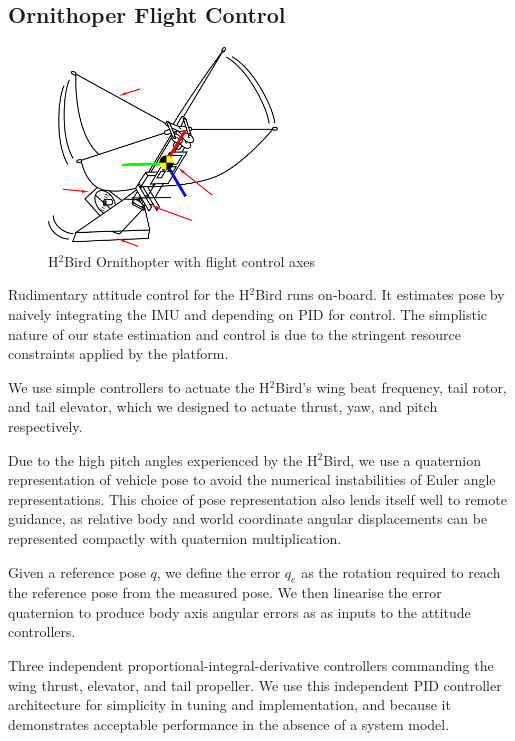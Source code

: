 \documentclass{aamas2013}
\begin{document}
\subsection{Ornithoper Flight Control}

\begin{figure}[tb]
\centering
\includegraphics[height=150pt]{figures/h2bird_axes.png}
\caption{H$^2$Bird Ornithopter with flight control axes}
\label{fig:h2Bird_axes}
\end{figure}

Rudimentary attitude control for the H$^2$Bird runs on-board. It estimates 
pose by naively integrating the IMU and depending on PID for control. The 
simplistic nature of our state estimation and control is due to the 
stringent resource constraints applied by the platform.

We use simple controllers to actuate the H$^2$Bird's wing beat frequency, 
tail rotor, and tail elevator, which we designed to actuate thrust, yaw, 
and pitch respectively.

Due to the high pitch angles experienced by the H$^2$Bird, we use a 
quaternion representation of vehicle pose to avoid the numerical 
instabilities of Euler angle representations. This choice of pose 
representation also lends itself well to remote guidance, as relative body 
and world coordinate angular displacements can be represented compactly 
with quaternion multiplication.~\cite{bowman:reasoning} 

Given a reference pose $q$, we define the error $q_e$ as the rotation 
required to reach the reference pose from the measured pose. We then 
linearise the error quaternion to produce body axis angular errors as as 
inputs to the attitude controllers. 

Three independent proportional-integral-derivative controllers commanding 
the wing thrust, elevator, and tail propeller. We use this independent PID 
controller architecture for simplicity in tuning and implementation, and 
because it demonstrates acceptable performance in the absence of a system 
model.
\end{document}
